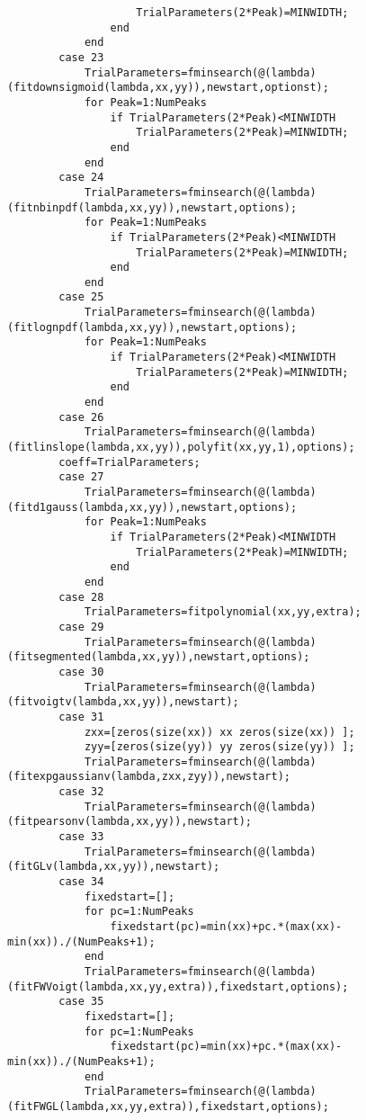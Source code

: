 \begin{lstlisting}
                    TrialParameters(2*Peak)=MINWIDTH;
                end
            end
        case 23
            TrialParameters=fminsearch(@(lambda)(fitdownsigmoid(lambda,xx,yy)),newstart,optionst);
            for Peak=1:NumPeaks
                if TrialParameters(2*Peak)<MINWIDTH
                    TrialParameters(2*Peak)=MINWIDTH;
                end
            end
        case 24
            TrialParameters=fminsearch(@(lambda)(fitnbinpdf(lambda,xx,yy)),newstart,options);
            for Peak=1:NumPeaks
                if TrialParameters(2*Peak)<MINWIDTH
                    TrialParameters(2*Peak)=MINWIDTH;
                end
            end
        case 25
            TrialParameters=fminsearch(@(lambda)(fitlognpdf(lambda,xx,yy)),newstart,options);
            for Peak=1:NumPeaks
                if TrialParameters(2*Peak)<MINWIDTH
                    TrialParameters(2*Peak)=MINWIDTH;
                end
            end
        case 26
            TrialParameters=fminsearch(@(lambda)(fitlinslope(lambda,xx,yy)),polyfit(xx,yy,1),options);
        coeff=TrialParameters;
        case 27
            TrialParameters=fminsearch(@(lambda)(fitd1gauss(lambda,xx,yy)),newstart,options);
            for Peak=1:NumPeaks
                if TrialParameters(2*Peak)<MINWIDTH
                    TrialParameters(2*Peak)=MINWIDTH;
                end
            end
        case 28
            TrialParameters=fitpolynomial(xx,yy,extra);
        case 29
            TrialParameters=fminsearch(@(lambda)(fitsegmented(lambda,xx,yy)),newstart,options);
        case 30
            TrialParameters=fminsearch(@(lambda)(fitvoigtv(lambda,xx,yy)),newstart);
        case 31
            zxx=[zeros(size(xx)) xx zeros(size(xx)) ];
            zyy=[zeros(size(yy)) yy zeros(size(yy)) ];
            TrialParameters=fminsearch(@(lambda)(fitexpgaussianv(lambda,zxx,zyy)),newstart);
        case 32
            TrialParameters=fminsearch(@(lambda)(fitpearsonv(lambda,xx,yy)),newstart);
        case 33
            TrialParameters=fminsearch(@(lambda)(fitGLv(lambda,xx,yy)),newstart);
        case 34
            fixedstart=[];
            for pc=1:NumPeaks
                fixedstart(pc)=min(xx)+pc.*(max(xx)-min(xx))./(NumPeaks+1);
            end
            TrialParameters=fminsearch(@(lambda)(fitFWVoigt(lambda,xx,yy,extra)),fixedstart,options);
        case 35
            fixedstart=[];
            for pc=1:NumPeaks
                fixedstart(pc)=min(xx)+pc.*(max(xx)-min(xx))./(NumPeaks+1);
            end
            TrialParameters=fminsearch(@(lambda)(fitFWGL(lambda,xx,yy,extra)),fixedstart,options);

\end{lstlisting}
